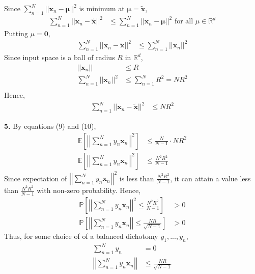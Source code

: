 \documentclass[12pt]{article}
\newcommand{\bd}[1]{\boldsymbol{#1}}
\begin{document}
Since \(\sum_{n=1}^N||\bd{x}_n - \bd\mu||^2\) is minimum at \(\bd\mu = \tilde{\bd{x}}\),
\begin{align*}
    \sum_{n=1}^N||\bd{x}_n - \tilde{\bd{x}}||^2 & \leq \sum_{n=1}^N||\bd{x}_n - \bd\mu||^2 \text{ for all \(\mu \in \mathbb{R}^d\)}
\end{align*}
Putting \(\mu = \bd{0}\),
\begin{align*}
    \sum_{n=1}^N||\bd{x}_n - \tilde{\bd{x}}||^2 & \leq \sum_{n=1}^N||\bd{x}_n||^2
\end{align*}
Since input space is a ball of radius \(R\) in \(\mathbb{R}^d\),
\begin{align*}
    ||\bd{x}_n|| & \leq R \\
    \sum_{n=1}^N||\bd{x}_n||^2 & \leq \sum_{n=1}^NR^2 = NR^2\\
\end{align*}
Hence, 
\begin{align} 
    \sum_{n=1}^N||\bd{x}_n - \tilde{\bd{x}}||^2 & \leq NR^2
\end{align}

\textbf{5.} By equations (9) and (10),
\begin{align} \nonumber
    \mathbb{E}\left[\left| \left| \sum_{n=1}^N y_n\bd{x}_n\right|\right|^2\right] & \leq \frac{N}{N-1}\cdot NR^2 \\ \nonumber
    \mathbb{E}\left[\left| \left| \sum_{n=1}^N y_n\bd{x}_n\right|\right|^2\right] & \leq \frac{N^2R^2}{N-1}
\end{align}
Since expectation of \(\left| \left| \sum_{n=1}^N y_n\bd{x}_n\right|\right|^2\) is less than \(\frac{N^2R^2}{N-1}\), it can attain a value less than \(\frac{N^2R^2}{N-1}\) with non-zero probability. Hence,
\begin{align*}
    \mathbb{P}\left[\left| \left| \sum_{n=1}^N y_n\bd{x}_n\right|\right|^2 \leq \frac{N^2R^2}{N-1}\right] & > 0 \\
    \mathbb{P}\left[\left| \left| \sum_{n=1}^N y_n\bd{x}_n\right|\right| \leq \frac{NR}{\sqrt{N-1}}\right] & > 0
\end{align*}
Thus, for some choice of of a balanced dichotomy \(y_1,...,y_n\),
\begin{align}
    \sum_{n=1}^Ny_n & = 0 \\
    \left| \left| \sum_{n=1}^N y_n\bd{x}_n\right|\right| & \leq \frac{NR}{\sqrt{N-1}}
\end{align}
\end{document}
